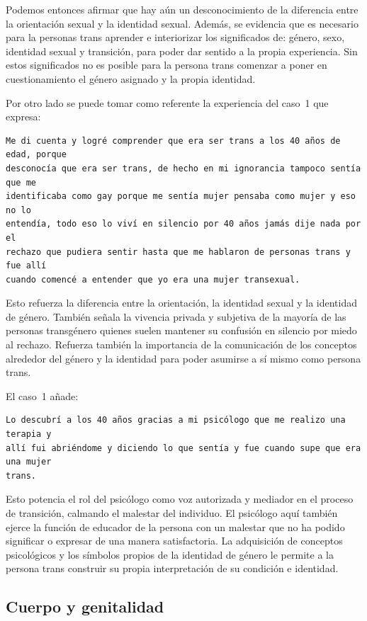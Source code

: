 Podemos entonces afirmar que hay aún un desconocimiento de la diferencia entre
la orientación sexual y la identidad sexual. Además, se evidencia que es
necesario para la personas trans aprender e interiorizar los significados de:
género, sexo, identidad sexual y transición, para poder dar sentido a la propia
experiencia. Sin estos significados no es posible para la persona trans comenzar
a poner en cuestionamiento el género asignado y la propia identidad.

Por otro lado se puede tomar como referente la experiencia del caso~1 que
expresa:

\begin{verbatim}
Me di cuenta y logré comprender que era ser trans a los 40 años de edad, porque
desconocía que era ser trans, de hecho en mi ignorancia tampoco sentía que me
identificaba como gay porque me sentía mujer pensaba como mujer y eso no lo
entendía, todo eso lo viví en silencio por 40 años jamás dije nada por el
rechazo que pudiera sentir hasta que me hablaron de personas trans y fue allí
cuando comencé a entender que yo era una mujer transexual.
\end{verbatim}

Esto refuerza la diferencia entre la orientación, la identidad sexual y la
identidad de género. También señala la vivencia privada y subjetiva de la
mayoría de las personas transgénero quienes suelen mantener su confusión en
silencio por miedo al rechazo. Refuerza también la importancia de la
comunicación de los conceptos alrededor del género y la identidad para poder
asumirse a sí mismo como persona trans.

El caso~1 añade:

\begin{verbatim}
Lo descubrí a los 40 años gracias a mi psicólogo que me realizo una terapia y
allí fui abriéndome y diciendo lo que sentía y fue cuando supe que era una mujer
trans.
\end{verbatim}

Esto potencia el rol del psicólogo como voz autorizada y mediador en el proceso
de transición, calmando el malestar del individuo. El psicólogo aquí también
ejerce la función de educador de la persona con un malestar que no ha podido
significar o expresar de una manera satisfactoria. La adquisición de conceptos
psicológicos y los símbolos propios de la identidad de género le permite a la
persona trans construir su propia interpretación de su condición e identidad.

\subsection{Cuerpo y genitalidad}

